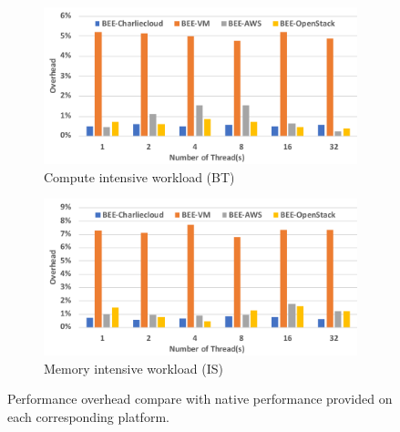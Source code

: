 \begin{figure}[t]
    \centering
    \begin{subfigure}[t]{0.49\textwidth}
        \includegraphics[width=\textwidth]{figures/bt.pdf}
        \caption{Compute intensive workload (BT)}
    \end{subfigure}
    \begin{subfigure}[t]{0.49\textwidth}
        \includegraphics[width=\textwidth]{figures/is.pdf}
        \caption{Memory intensive workload (IS)}
    \end{subfigure}
    \vspace*{-0.5em}
    \caption{Performance overhead compare with native performance provided on each corresponding platform.}
    \label{comp}
    \vspace*{-1em}
\end{figure}

